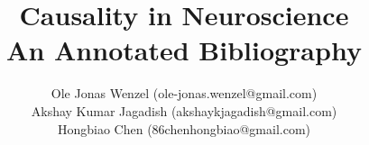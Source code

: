 \documentclass [11pt]{article}
\title{Causality in Neuroscience\\\medskip An Annotated Bibliography}
\author{Ole Jonas Wenzel (ole-jonas.wenzel@gmail.com)\\ Akshay Kumar Jagadish (akshaykjagadish@gmail.com)\\Hongbiao Chen (86chenhongbiao@gmail.com)}
\affil{University of T\"{u}bingen, Germany}
\begin{document}
\maketitle
\nocite{*}


\end{document}
